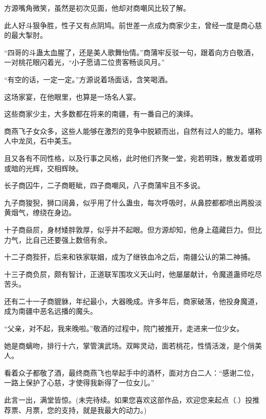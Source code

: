 \begin{this_body}
方源嘴角微笑，虽然是初次见面，他却对商嘲风比较了解。

此人好斗狠争胜，性子又有点阴鸠。前世差一点成为商家少主，曾经一度是商心慈的最大掣肘。

“四哥的斗蛊太血腥了，还是美人歌舞怡情。”商蒲牢反驳一句，跟着向方白敬酒，一对桃花眼闪着光，“小子愿请二位贵客畅谈风月。”

“有空的话，一定一定。”方源说着场面话，含笑喝酒。

这场家宴，在他眼里，也算是一场名人宴。

这些商家少主，大多数都在将来的南疆，有一番自己的演绎。

商燕飞子女众多，这些人能够在激烈的竞争中脱颖而出，自然有过人的能力。堪称人中龙凤，石中美玉。

且又各有不同性格，以及行事之风格，此时他们齐聚一堂，宛若明珠，散发着或明或暗的光辉，交相辉映。

长子商囚牛，二子商睚眦，四子商嘲风，八子商蒲牢且不多说。

九子商狻猊，狮口阔鼻，似乎用了什么蛊虫，每次呼吸时，从鼻腔都都喷出两股淡黄烟气，缭绕在身边。

十子商赑屃，身材矮胖敦厚，似乎并不起眼。但方源却知，他身上蕴藏巨力。但比力气，比自己还要强上数倍有余。

十二子商狴犴，后来和铁家联姻，成为了继铁血冷之后，南疆公认的第二神捕。

十三子商负屃，颇有智计，正道联军围攻义天山时，他屡屡献计，令魔道蛊师吃尽苦头。

还有二十一子商貔貅，年纪最小，大器晚成。许多年后，商家破落，他投身魔道，成为南疆中恶名远播的魔头。

“父亲，对不起，我来晚啦。”敬酒的过程中，院门被推开，走进来一位少女。

她是商螭吻，排行十六，掌管演武场。双眸灵动，面若桃花，性情活泼，是个俏美人。

看着众子都敬了酒，最终商燕飞也举起手中的酒杯，面对方白二人：“感谢二位，一路上保护了心慈，才使得我新得了一位女儿。”

此言一出，满堂皆惊。(未完待续。如果您喜欢这部作品，欢迎您来起点（.）投推荐票、月票，您的支持，就是我最大的动力。)

\end{this_body}

